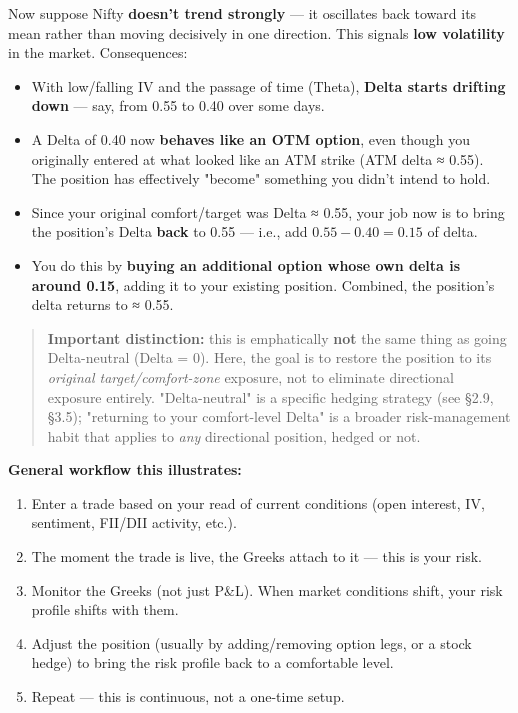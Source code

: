 \documentclass[12pt,openany]{book}
\theoremstyle{definition}
\theoremstyle{remark}
\begin{document}
Now suppose Nifty \textbf{doesn't trend strongly} — it oscillates back toward its mean rather than moving decisively in one direction. This signals \textbf{low volatility} in the market. Consequences:

\begin{itemize}
\item With low/falling IV and the passage of time (Theta), \textbf{Delta starts drifting down} — say, from 0.55 to 0.40 over some days.
\item A Delta of 0.40 now \textbf{behaves like an OTM option}, even though you originally entered at what looked like an ATM strike (ATM delta ≈ 0.55). The position has effectively "become" something you didn't intend to hold.
\item Since your original comfort/target was Delta ≈ 0.55, your job now is to bring the position's Delta \textbf{back} to 0.55 — i.e., add \(0.55 - 0.40 = 0.15\) of delta.
\item You do this by \textbf{buying an additional option whose own delta is around 0.15}, adding it to your existing position. Combined, the position's delta returns to ≈ 0.55.
\end{itemize}

\begin{quote}
\textbf{Important distinction:} this is emphatically \textbf{not} the same thing as going Delta-neutral (Delta = 0). Here, the goal is to restore the position to its \emph{original target/comfort-zone} exposure, not to eliminate directional exposure entirely. "Delta-neutral" is a specific hedging strategy (see \S{}2.9, \S{}3.5); "returning to your comfort-level Delta" is a broader risk-management habit that applies to \emph{any} directional position, hedged or not.
\end{quote}

\textbf{General workflow this illustrates:}
\begin{enumerate}
\item Enter a trade based on your read of current conditions (open interest, IV, sentiment, FII/DII activity, etc.).
\item The moment the trade is live, the Greeks attach to it — this is your risk.
\item Monitor the Greeks (not just P\&L). When market conditions shift, your risk profile shifts with them.
\item Adjust the position (usually by adding/removing option legs, or a stock hedge) to bring the risk profile back to a comfortable level.
\item Repeat — this is continuous, not a one-time setup.
\end{enumerate}
\end{document}
